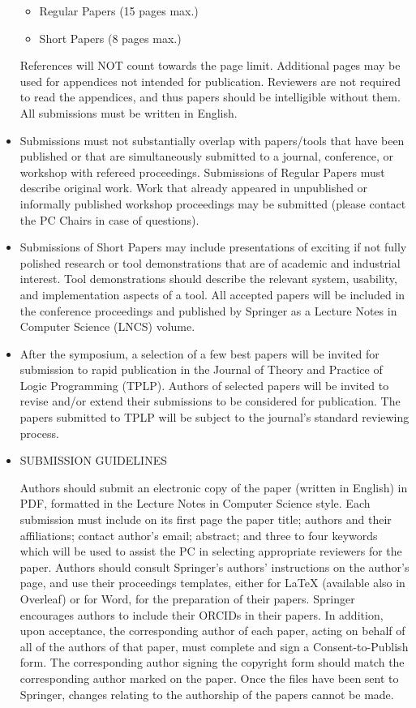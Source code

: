 \documentclass[prodmode,acmtecs]{acmsmall} %
\begin{document}
\begin{itemize}
\begin{itemize}\item  Regular Papers (15 pages max.)
\item  Short Papers (8 pages max.)
\end{itemize} 
  References will NOT count towards the page limit. Additional pages may be used for appendices not intended for publication. Reviewers are not required to read the appendices, and thus papers should be intelligible without them. All submissions must be written in English. 
 
\item  Submissions must not substantially overlap with papers/tools that have been published or that are simultaneously submitted to a journal, conference, or workshop with refereed proceedings. Submissions of Regular Papers must describe original work. Work that already appeared in unpublished or informally published workshop proceedings may be submitted (please contact the PC Chairs in case of questions). 
 
\item  Submissions of Short Papers may include presentations of exciting if not fully polished research or tool demonstrations that are of academic and industrial interest. Tool demonstrations should describe the relevant system, usability, and implementation aspects of a tool. All accepted papers will be included in the conference proceedings and published by Springer as a Lecture Notes in Computer Science (LNCS) volume. 
 
\item  After the symposium, a selection of a few best papers will be invited for submission to rapid publication in the Journal of Theory and Practice of Logic Programming (TPLP). Authors of selected papers will be invited to revise and/or extend their submissions to be considered for publication. The papers submitted to TPLP will be subject to the journal's standard reviewing process. 
 
\item  SUBMISSION GUIDELINES 
 
   Authors should submit an electronic copy of the paper (written in English) in PDF, formatted in the Lecture Notes in Computer Science style. Each submission must include on its first page the paper title; authors and their affiliations; contact author's email; abstract; and three to four keywords which will be used to assist the PC in selecting appropriate reviewers for the paper. Authors should consult Springer's authors' instructions on the author's page, and use their proceedings templates, either for LaTeX (available also in Overleaf) or for Word, for the preparation of their papers. Springer encourages authors to include their ORCIDs in their papers. In addition, upon acceptance, the corresponding author of each paper, acting on behalf of all of the authors of that paper, must complete and sign a Consent-to-Publish form. The corresponding author signing the copyright form should match the corresponding author marked on the paper. Once the files have been sent to Springer, changes relating to the authorship of the papers cannot be made. 
 

\end{itemize}
\end{document}
